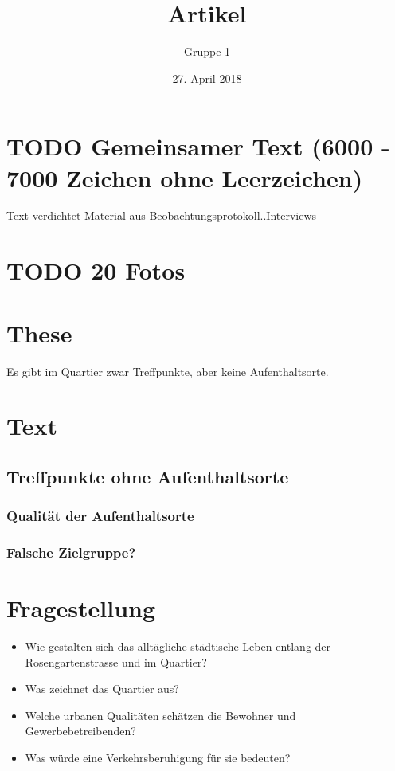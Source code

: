 \documentclass[a4paper,ngerman,11pt]{scrartcl}
\author{Gruppe 1}
\date{27. April 2018}
\title{Artikel}
\begin{document}
\maketitle
\tableofcontents


\section{{\bfseries\sffamily TODO} Gemeinsamer Text (6000 - 7000 Zeichen ohne Leerzeichen)}
\label{sec-1}

Text verdichtet Material aus Beobachtungsprotokoll..Interviews

\section{{\bfseries\sffamily TODO} 20 Fotos}
\label{sec-2}


\section{These}
\label{sec-3}

Es gibt im Quartier zwar Treffpunkte, aber keine Aufenthaltsorte.

\section{Text}
\label{sec-4}

\subsection{Treffpunkte ohne Aufenthaltsorte}
\label{sec-4-1}

\subsubsection{Qualität der Aufenthaltsorte}
\label{sec-4-1-1}

\subsubsection{Falsche Zielgruppe?}
\label{sec-4-1-2}

\section{Fragestellung}
\label{sec-5}

\begin{itemize}
\item Wie gestalten sich das alltägliche städtische Leben entlang der
Rosengartenstrasse und im Quartier?

\item Was zeichnet das Quartier aus?

\item Welche urbanen Qualitäten schätzen die Bewohner und Gewerbebetreibenden?

\item Was würde eine Verkehrsberuhigung für sie bedeuten?
\end{itemize}
\end{document}
